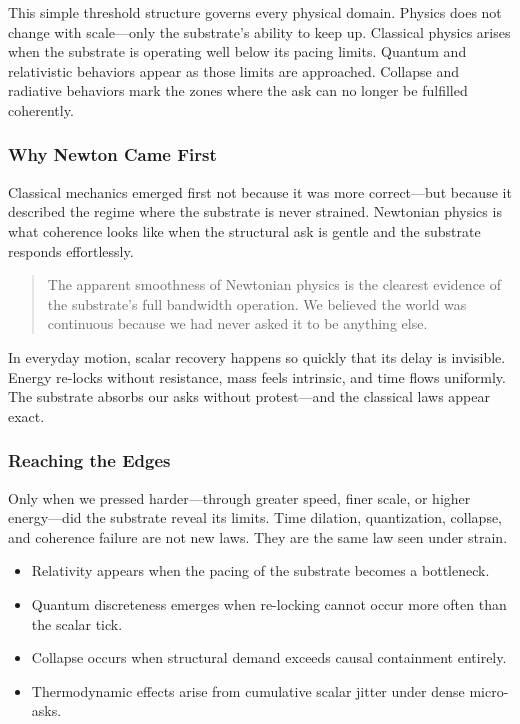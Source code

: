 \documentclass[entropy,article,submit,pdftex,moreauthors]{Definitions/mdpi}
\begin{document}
This simple threshold structure governs every physical domain. Physics does not change with scale—only the substrate’s ability to keep up. Classical physics arises when the substrate is operating well below its pacing limits. Quantum and relativistic behaviors appear as those limits are approached. Collapse and radiative behaviors mark the zones where the ask can no longer be fulfilled coherently.

\subsubsection*{Why Newton Came First}

Classical mechanics emerged first not because it was more correct—but because it described the regime where the substrate is never strained. Newtonian physics is what coherence looks like when the structural ask is gentle and the substrate responds effortlessly.

\begin{quote}
The apparent smoothness of Newtonian physics is the clearest evidence of the substrate’s full bandwidth operation. We believed the world was continuous because we had never asked it to be anything else.
\end{quote}

In everyday motion, scalar recovery happens so quickly that its delay is invisible. Energy re-locks without resistance, mass feels intrinsic, and time flows uniformly. The substrate absorbs our asks without protest—and the classical laws appear exact.

\subsubsection*{Reaching the Edges}

Only when we pressed harder—through greater speed, finer scale, or higher energy—did the substrate reveal its limits. Time dilation, quantization, collapse, and coherence failure are not new laws. They are the same law seen under strain.

\begin{itemize}
    \item Relativity appears when the pacing of the substrate becomes a bottleneck.
    \item Quantum discreteness emerges when re-locking cannot occur more often than the scalar tick.
    \item Collapse occurs when structural demand exceeds causal containment entirely.
    \item Thermodynamic effects arise from cumulative scalar jitter under dense micro-asks.
\end{itemize}
\end{document}
